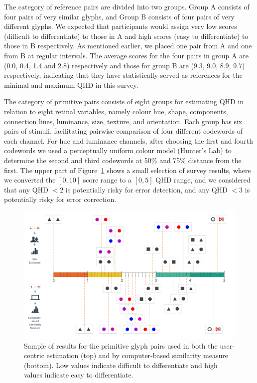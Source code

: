 The category of reference pairs are divided into two groups.
Group A consists of four pairs of very similar glyphs, and Group B consists of four pairs of very different glyphs. 
We expected that participants would assign very low scores (difficult to differentiate) to those in A and high scores (easy to differentiate) to those in B respectively. As mentioned earlier, we placed one pair from A and one from B at regular intervals.
The average scores for the four pairs in group A are (0.0, 0.4, 1.4 and 2.8) respectively and those for group B are (9.3, 9.0, 8.9, 9.7) respectively, indicating that they have statistically served as references for the minimal and maximum QHD in this survey.

The category of primitive pairs consists of eight groups for estimating QHD in relation to eight retinal variables, namely colour hue, shape, components, connection lines, luminance, size, texture, and orientation.
Each group has six pairs of stimuli, facilitating pairwise comparison of four different codewords of each channel.
For hue and luminance channels, after choosing the first and fourth codewords we used a perceptually uniform colour model (Hunter's Lab) to determine the second and third codewords at 50\% and 75\% distance from the first.
The upper part of Figure~\ref{fig:eval_glyph_scores} shows a small selection of survey results, where we converted the $[0, 10]$ score range to a $[0, 5]$ QHD range, and we considered that any QHD $<2$ is potentially risky for error detection, and any QHD $<3$ is potentially risky for error correction.

\begin{figure}[h!]
\begin{center}
\includegraphics[width=\textwidth]{images/filesystem/latest/Comparison}
\end{center}
\caption{Sample of results for the primitive glyph pairs used in both the user-centric estimation (top) and by computer-based similarity measure (bottom). Low values indicate difficult to differentiate and high values indicate easy to differentiate.}
\label{fig:eval_glyph_scores}
\end{figure}


